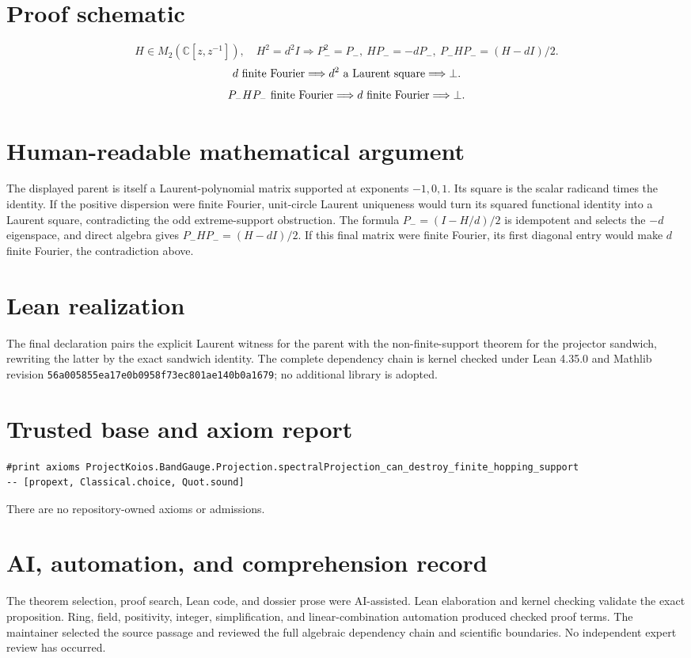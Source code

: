 \documentclass[11pt]{article}
\begin{document}
\section{Proof schematic}
\[
 H\in M_2(\mathbb C[z,z^{-1}]),\quad H^2=d^2I
 \Longrightarrow P_-^2=P_-,\ HP_-=-dP_-,\ P_-HP_-=(H-dI)/2.
\]
\[
 d\ \hbox{finite Fourier}
 \Longrightarrow d^2\ \hbox{a Laurent square}
 \Longrightarrow\bot.
\]
\[
 P_-HP_-\ \hbox{finite Fourier}
 \Longrightarrow d\ \hbox{finite Fourier}
 \Longrightarrow\bot.
\]

\section{Human-readable mathematical argument}
The displayed parent is itself a Laurent-polynomial matrix supported at exponents
$-1,0,1$. Its square is the scalar radicand times the identity. If the positive dispersion
were finite Fourier, unit-circle Laurent uniqueness would turn its squared functional
identity into a Laurent square, contradicting the odd extreme-support obstruction. The
formula $P_-=(I-H/d)/2$ is idempotent and selects the $-d$ eigenspace, and direct algebra
gives $P_-HP_-=(H-dI)/2$. If this final matrix were finite Fourier, its first diagonal
entry would make $d$ finite Fourier, the contradiction above.

\section{Lean realization}
The final declaration pairs the explicit Laurent witness for the parent with the
non-finite-support theorem for the projector sandwich, rewriting the latter by the exact
sandwich identity. The complete dependency chain is kernel checked under Lean 4.35.0 and
Mathlib revision \texttt{56a005855ea17e0b0958f73ec801ae140b0a1679}; no additional
library is adopted.

\section{Trusted base and axiom report}
\begin{lstlisting}
#print axioms ProjectKoios.BandGauge.Projection.spectralProjection_can_destroy_finite_hopping_support
-- [propext, Classical.choice, Quot.sound]
\end{lstlisting}
There are no repository-owned axioms or admissions.

\section{AI, automation, and comprehension record}
The theorem selection, proof search, Lean code, and dossier prose were AI-assisted. Lean
elaboration and kernel checking validate the exact proposition. Ring, field, positivity,
integer, simplification, and linear-combination automation produced checked proof terms.
The maintainer selected the source passage and reviewed the full algebraic dependency
chain and scientific boundaries. No independent expert review has occurred.
\end{document}

